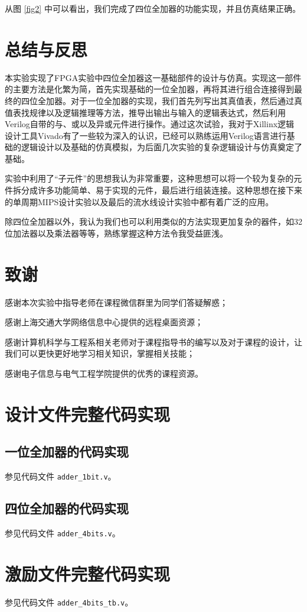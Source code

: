 \documentclass{cumcm}
\numberwithin{equation}{section}
\numberwithin{equation}{subsection}
\begin{document}
从图 \ref{fig2} 中可以看出，我们完成了四位全加器的功能实现，并且仿真结果正确。

\section{总结与反思}\label{section5}

本实验实现了FPGA实验中四位全加器这一基础部件的设计与仿真。实现这一部件的主要方法是化繁为简，首先实现基础的一位全加器，再将其进行组合连接得到最终的四位全加器。对于一位全加器的实现，我们首先列写出其真值表，然后通过真值表找规律以及逻辑推理等方法，推导出输出与输入的逻辑表达式，然后利用Verilog自带的与、或以及异或元件进行操作。通过这次试验，我对于Xillinx逻辑设计工具Vivado有了一些较为深入的认识，已经可以熟练运用Verilog语言进行基础的逻辑设计以及基础的仿真模拟，为后面几次实验的复杂逻辑设计与仿真奠定了基础。

实验中利用了“子元件”的思想我认为非常重要，这种思想可以将一个较为复杂的元件拆分成许多功能简单、易于实现的元件，最后进行组装连接。这种思想在接下来的单周期MIPS设计实验以及最后的流水线设计实验中都有着广泛的应用。

除四位全加器以外，我认为我们也可以利用类似的方法实现更加复杂的器件，如32位加法器以及乘法器等等，熟练掌握这种方法令我受益匪浅。

\section{致谢}\label{section6}
感谢本次实验中指导老师在课程微信群里为同学们答疑解惑；

感谢上海交通大学网络信息中心提供的远程桌面资源；

感谢计算机科学与工程系相关老师对于课程指导书的编写以及对于课程的设计，让我们可以更快更好地学习相关知识，掌握相关技能；

感谢电子信息与电气工程学院提供的优秀的课程资源。
%
%

\clearpage
\begin{appendices}
\section{设计文件完整代码实现}\label{appsection1}
\subsection{一位全加器的代码实现}\label{appsection1.1}
参见代码文件 \texttt{adder\_1bit.v}。
\subsection{四位全加器的代码实现}\label{appsection1.2}
参见代码文件 \texttt{adder\_4bits.v}。
\section{激励文件完整代码实现}\label{appsection2}
参见代码文件 \texttt{adder\_4bits\_tb.v}。
\end{appendices}
\end{document}

